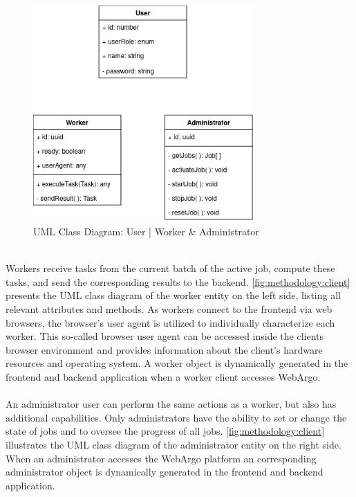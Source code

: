 \begin{figure}[htbp]
    \centering
    \includegraphics[width=0.75\textwidth]{gfx/figures/Client.png}
    \caption{\acs{UML} Class Diagram: User | Worker \& Administrator}
    \label{fig:methodology:client}
\end{figure}
~\\
Workers receive tasks from the current batch of the active job, compute these tasks, and send the corresponding results to the backend. \autoref{fig:methodology:client} presents the \ac{UML} class diagram of the worker entity on the left side, listing all relevant attributes and methods. As workers connect to the frontend via web browsers, the browser's user agent is utilized to individually characterize each worker. This so-called browser user agent can be accessed inside the clients browser environment and provides information about the client's hardware resources and operating system. A worker object is dynamically generated in the frontend and backend application when a worker client accesses WebArgo.
\\~\\
An administrator user can perform the same actions as a worker, but also has additional capabilities. Only administrators have the ability to set or change the state of jobs and to oversee the progress of all jobs. \autoref{fig:methodology:client} illustrates the \ac{UML} class diagram of the administrator entity on the right side. When an administrator accesses the WebArgo platform an corresponding administrator object is dynamically generated in the frontend and backend application.

